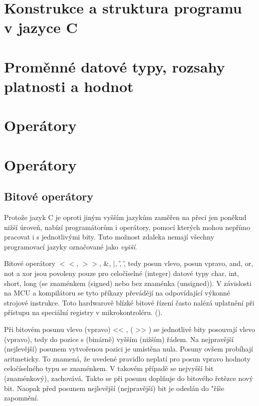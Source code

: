   \section{Konstrukce a struktura programu v jazyce C}
  \section{Proměnné datové typy, rozsahy platnosti a hodnot}
  \section{Operátory}
  \section{Operátory}
    \subsection{Bitové  operátory}
      Protože jazyk C je oproti jiným vyšším jazykům zaměřen na přeci jen poněkud nižší úroveň, 
      nabízí programátorům i operátory, pomocí kterých mohou nepřímo pracovat i s jednotlivými bity.
      Tuto možnost zdaleka nemají všechny programovací jazyky označované jako \emph{vyšší}.
      
      Bitové operátory \(<<\), \(>>\), \&, |, \~, \^, tedy posun vlevo, posun vpravo, and, or, not 
      a xor jsou povoleny pouze pro celočíselné (integer) datové typy char, int, short, long (se 
      znaménkem (signed) nebo bez znaménka (unsigned)). V závislosti na MCU a kompilátoru se tyto 
      příkazy převádějí na odpovídající výkonné strojové instrukce. Toto hardwarově blízké bitové 
      řízení často nalézá uplatnění při přístupu na speciální registry v mikrokontroléru. 
      (\cite[s.~79]{Burkhard2003}).
      
      Při bitovém posunu vlevo (vpravo) << , ( >> ) se jednotlivé bity posouvají vlevo (vpravo), 
      tedy do pozice s (binárně) vyšším (nižším) řádem. Na nejpravější (nejlevější) posunem 
      vytvořenou pozici je umístěna nula. Posuny ovšem probíhají aritmeticky. To znamená, že 
      uvedené pravidlo neplatí pro posun vpravo hodnoty celočíselného typu se znaménkem. V takovém 
      případě se nejvyšší bit (znaménkový), zachovává. Takto se při posunu doplňuje do bitového 
      řetězce nový bit. Naopak před posunem nejlevější (nejpravější) bit je odeslán do
      "říše zapomnění.
      
